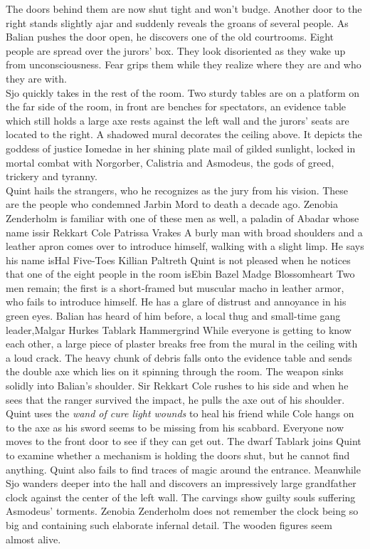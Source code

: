 The doors behind them are now shut tight and won't budge. Another door to the right stands slightly ajar and suddenly reveals the groans of several people. As Balian pushes the door open, he discovers one of the old courtrooms. Eight people are spread over the jurors' box. They look disoriented as they wake up from unconsciousness. Fear grips them while they realize where they are and who they are with.\\

Sjo quickly takes in the rest of the room. Two sturdy tables are on a platform on the far side of the room, in front are benches for spectators, an evidence table which still holds a large axe rests against the left wall and the jurors' seats are located to the right. A shadowed mural decorates the ceiling above. It depicts the goddess of justice Iomedae in her shining plate mail of gilded sunlight, locked in mortal combat with Norgorber, Calistria and Asmodeus, the gods of greed, trickery and tyranny.\\

Quint hails the strangers, who he recognizes as the jury from his vision. These are the people who condemned Jarbin Mord to death a decade ago. Zenobia Zenderholm is familiar with one of these men as well, a paladin of Abadar whose name issir Rekkart Cole Patrissa Vrakes A burly man with broad shoulders and a leather apron comes over to introduce himself, walking with a slight limp. He says his name isHal Five-Toes Killian Paltreth Quint is not pleased when he notices that one of the eight people in the room isEbin Bazel Madge Blossomheart Two men remain; the first is a short-framed but muscular macho in leather armor, who fails to introduce himself. He has a glare of distrust and annoyance in his green eyes. Balian has heard of him before, a local thug and small-time gang leader,Malgar Hurkes Tablark Hammergrind While everyone is getting to know each other, a large piece of plaster breaks free from the mural in the ceiling with a loud crack. The heavy chunk of debris falls onto the evidence table and sends the double axe which lies on it spinning through the room. The weapon sinks solidly into Balian's shoulder. Sir Rekkart Cole rushes to his side and when he sees that the ranger survived the impact, he pulls the axe out of his shoulder. Quint uses the {\itshape wand of cure light wounds} to heal his friend while Cole hangs on to the axe as his sword seems to be missing from his scabbard. Everyone now moves to the front door to see if they can get out. The dwarf Tablark joins Quint to examine whether a mechanism is holding the doors shut, but he cannot find anything. Quint also fails to find traces of magic around the entrance. Meanwhile Sjo wanders deeper into the hall and discovers an impressively large grandfather clock against the center of the left wall. The carvings show guilty souls suffering Asmodeus' torments. Zenobia Zenderholm does not remember the clock being so big and containing such elaborate infernal detail. The wooden figures seem almost alive.\\


